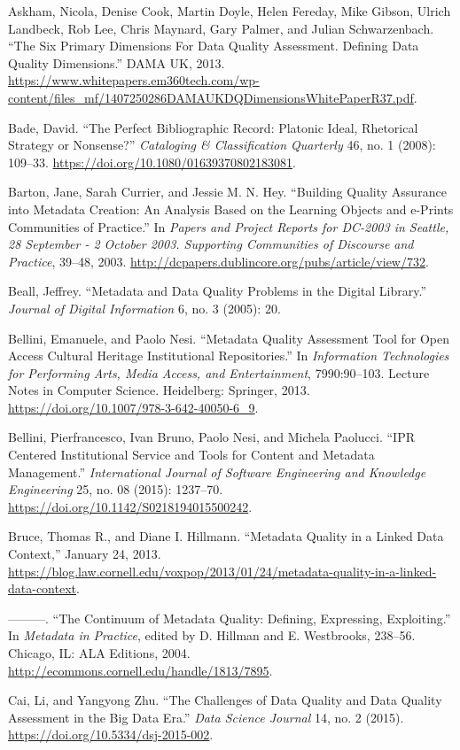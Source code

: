 Askham, Nicola, Denise Cook, Martin Doyle, Helen Fereday, Mike Gibson, Ulrich Landbeck, Rob Lee, Chris Maynard, Gary Palmer, and Julian Schwarzenbach. “The Six Primary Dimensions For Data Quality Assessment. Defining Data Quality Dimensions.” DAMA UK, 2013. \url{https://www.whitepapers.em360tech.com/wp-content/files_mf/1407250286DAMAUKDQDimensionsWhitePaperR37.pdf}.

Bade, David. “The Perfect Bibliographic Record: Platonic Ideal, Rhetorical Strategy or Nonsense?” \emph{Cataloging \& Classification Quarterly} 46, no. 1 (2008): 109–33. \url{https://doi.org/10.1080/01639370802183081}.

Barton, Jane, Sarah Currier, and Jessie M. N. Hey. “Building Quality Assurance into Metadata Creation: An Analysis Based on the Learning Objects and e-Prints Communities of Practice.” In \emph{Papers and Project Reports for DC-2003 in Seattle, 28 September - 2 October 2003. Supporting Communities of Discourse and Practice}, 39–48, 2003. \url{http://dcpapers.dublincore.org/pubs/article/view/732}.

Beall, Jeffrey. “Metadata and Data Quality Problems in the Digital Library.” \emph{Journal of Digital Information} 6, no. 3 (2005): 20.

Bellini, Emanuele, and Paolo Nesi. “Metadata Quality Assessment Tool for Open Access Cultural Heritage Institutional Repositories.” In \emph{Information Technologies for Performing Arts, Media Access, and Entertainment}, 7990:90–103. Lecture Notes in Computer Science. Heidelberg: Springer, 2013. \url{https://doi.org/10.1007/978-3-642-40050-6_9}.

Bellini, Pierfrancesco, Ivan Bruno, Paolo Nesi, and Michela Paolucci. “IPR Centered Institutional Service and Tools for Content and Metadata Management.” \emph{International Journal of Software Engineering and Knowledge Engineering} 25, no. 08 (2015): 1237–70. \url{https://doi.org/10.1142/S0218194015500242}.

Bruce, Thomas R., and Diane I. Hillmann. “Metadata Quality in a Linked Data Context,” January 24, 2013. \url{https://blog.law.cornell.edu/voxpop/2013/01/24/metadata-quality-in-a-linked-data-context}.

———. “The Continuum of Metadata Quality: Defining, Expressing, Exploiting.” In \emph{Metadata in Practice}, edited by D. Hillman and E. Westbrooks, 238–56. Chicago, IL: ALA Editions, 2004. \url{http://ecommons.cornell.edu/handle/1813/7895}.

Cai, Li, and Yangyong Zhu. “The Challenges of Data Quality and Data Quality Assessment in the Big Data Era.” \emph{Data Science Journal} 14, no. 2 (2015). \url{https://doi.org/10.5334/dsj-2015-002}.

